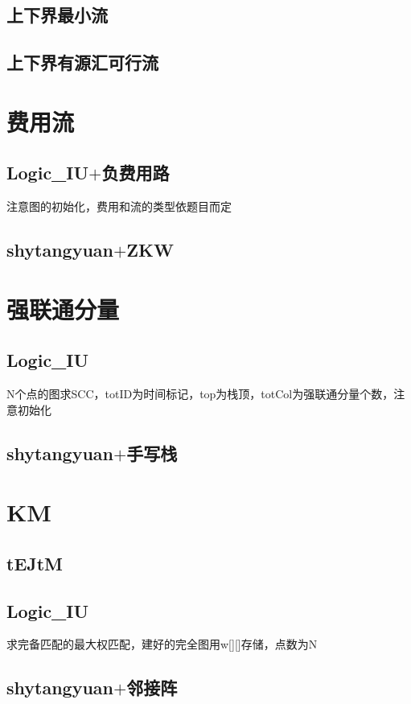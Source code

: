 \documentclass[a4paper,10pt]{book}
\begin{document}
		\subsection{上下界最小流}
			
		\subsection{上下界有源汇可行流}
			

	\section{费用流}
		\subsection{Logic\_IU$+$负费用路}
			注意图的初始化，费用和流的类型依题目而定
			
		\subsection{shytangyuan$+$ZKW}
			

	\section{强联通分量}
		\subsection{Logic\_IU}
			N个点的图求SCC，totID为时间标记，top为栈顶，totCol为强联通分量个数，注意初始化
			
		\subsection{shytangyuan$+$手写栈}
			
	
	\section{KM}
		\subsection{tEJtM}
			
        \subsection{Logic\_IU}
	        求完备匹配的最大权匹配，建好的完全图用w[][]存储，点数为N
	        
		\subsection{shytangyuan$+$邻接阵}
			
\end{document}
